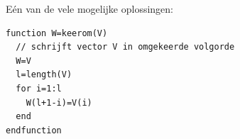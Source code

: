 \begin{Oplossing}{9.15}
Eén van de vele mogelijke oplossingen:
\begin{lstlisting}[caption={Een vector omkeren}, label=vectoromkeren]
function W=keerom(V)
  // schrijft vector V in omgekeerde volgorde
  W=V
  l=length(V)
  for i=1:l
    W(l+1-i)=V(i)
  end
endfunction
\end{lstlisting}
\end{Oplossing}

